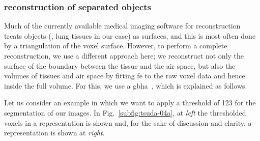 \subsubsection{\threed reconstruction of separated objects}
Much of the currently available medical imaging software for \threed reconstruction treats objects (\ie, lung tissues in our case) as surfaces, and this is most often done by a triangulation of the voxel surface. However, to perform a complete \threed reconstruction, we use a different approach here; we reconstruct not only the surface of the boundary between the tissue and the air space, but also the volumes of tissues and air space by fitting \ac{fe} to the raw voxel data and hence inside the full volume. For this, we use a \ac{gbha}~\cite{Schneiders1996}, which is explained as follows.

Let us consider an example in which we want to apply a threshold of 123 for the segmentation of our images. In Fig.~\ref{subfig:tsuda-04a}, at \textit{left} the thresholded voxels in a \threed representation is shown and, for the sake of discussion and clarity, a \twod representation is shown at \textit{right}.
